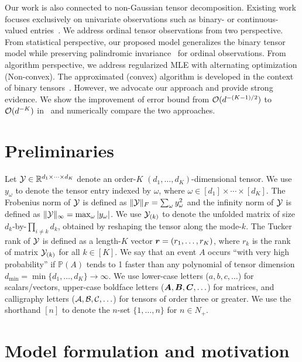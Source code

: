 \documentclass{article}
\theoremstyle{plain}
\theoremstyle{definition}
\begin{document}
Our work is also connected to non-Gaussian tensor decomposition. Existing work focuses exclusively on univariate observations such as binary- or continuous-valued entries~\citep{wang2018learning,hong2018generalized,ghadermarzy2018learning}. We address ordinal tensor observations from two perspective.
From statistical perspective, our proposed model generalizes the binary tensor model while preserving palindromic invariance~\cite{mccullagh1980regression} for ordinal observations. 
From algorithm perspective,  we address regularized MLE with  alternating optimization (Non-convex). The approximated (convex) algorithm is developed in the context of binary tensors~\cite{ghadermarzy2018learning}.
However, we advocate our approach and provide strong evidence. We show the improvement of error bound from $\mathcal{O}(d^{-(K-1)/2})$ to $\mathcal{O}(d^{-K})$ in~\cite{ghadermarzy2018learning} and numerically compare the two approaches.


\vspace{-.3cm}
\section{Preliminaries}
\vspace{-.3cm}
Let $\mathcal{Y}\in\mathbb{R}^{d_1\times \cdots \times d_K}$ denote an order-$K$ $(d_1,\ldots,d_K)$-dimensional tensor. We use $y_\omega$ to denote the tensor entry indexed by $\omega$, where $\omega\in[d_1]\times\cdots\times[d_K]$.  The Frobenius norm of $\mathcal{Y}$ is defined as $\lVert\mathcal{Y}\rVert_F=\sum_\omega y^2_\omega$ and the infinity norm of $\mathcal{Y}$ is defined as $\lVert\mathcal{Y}\rVert_\infty=\max_{\omega}|y_\omega|$. We use $\mathcal{Y}_{(k)}$ to denote the unfolded matrix of size $d_k$-by-$\prod_{i\neq k}d_k$, obtained by reshaping the tensor along the mode-$k$. The Tucker rank of $\mathcal{Y}$ is defined as a length-$K$ vector $\bm{r} = (r_1,\ldots,r_K)$, where $r_k$ is the rank of matrix $\mathcal{Y}_{(k)}$ for all $k \in[K]$. We say that an event $A$ occurs ``with very high probability'' if $\mathbb{P}(A)$ tends to 1 faster than any polynomial of tensor dimension $d_{\min}=\min\{d_1,\ldots,d_K\} \to\infty$.
We use lower-case letters ($a, b, c, \ldots$) for scalars/vectors, upper-case boldface letters ($\bm A, \bm B, \bm C, \ldots$) for matrices, and calligraphy letters ($\mathcal{A},\mathcal{B},\mathcal{C},\ldots$) for tensors of order three or greater. We use the shorthand $[n]$ to denote the $n$-set $\{1,\ldots,n\}$ for $n \in N_{+}$.

\vspace{-.3cm}
\section{Model formulation and motivation}
\vspace{-.2cm}
\end{document}
